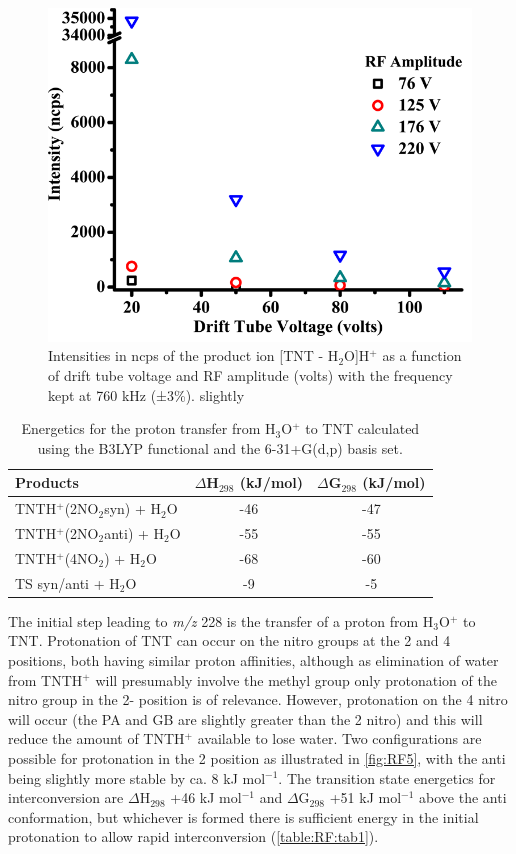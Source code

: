 \begin{figure}%
\centering
\includegraphics[height=0.3\textheight]{pics/RFpaper_fig4.png}
\caption{Intensities in ncps of the product ion [TNT - H$_2$O]H$^+$ as a function of drift tube voltage and RF amplitude (volts) with the frequency kept at 760 kHz (±3\%).
slightly}
\label{fig:RF4}
\end{figure}

\begin{table}%
\caption{Energetics for the proton transfer from H$_3$O$^+$ to TNT calculated using the B3LYP functional and the 6-31+G(d,p) basis set.}
\label{table:RF:tab1}
\begin{tabular}{lcc}
\hline
\textbf{Products} & \textbf{$\Delta$H$_{298}$ (kJ/mol)} & \textbf{$\Delta$G$_{298}$ (kJ/mol)} \\
\hline
TNTH$^+$(2NO$_2$syn) + H$_2$O  & -46   & -47     \\
TNTH$^+$(2NO$_2$anti) + H$_2$O & -55   & -55     \\
TNTH$^+$(4NO$_2$) + H$_2$O     & -68   & -60     \\
TS syn/anti + H$_2$O          & -9    & -5      \\ 
\hline
\end{tabular}
\end{table}

The initial step leading to \textit{m/z} 228 is the transfer of a proton from H$_3$O$^+$ to TNT. Protonation of TNT can occur on the nitro groups at the 2 and 4 positions, both having similar proton affinities, although as elimination of water from TNTH$^+$ will presumably involve the methyl group only protonation of the nitro group in the 2- position is of relevance. However, protonation on the 4 nitro will occur (the PA and GB are slightly greater than the 2 nitro) and this will reduce the amount of TNTH$^+$ available to lose water. Two configurations are
possible for protonation in the 2 position as illustrated in \autoref{fig:RF5}, with the anti being slightly more stable by ca. 8 kJ mol$^{-1}$. The transition state energetics for interconversion are $\Delta$H$_{298}$
 +46 kJ mol$^{-1}$ and $\Delta$G$_{298}$ +51 kJ mol$^{-1}$ above the anti conformation, but whichever is
formed there is sufficient energy in the initial protonation to allow rapid interconversion (\autoref{table:RF:tab1}).

